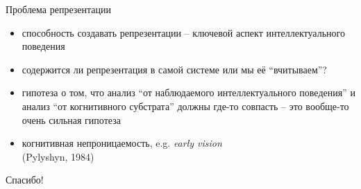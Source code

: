 \documentclass{beamer}
\begin{document}
\begin{frame}{Проблема репрезентации}
\begin{itemize}
	\item способность создавать репрезентации -- ключевой аспект интеллектуального поведения
	\medskip
	\item содержится ли репрезентация в самой системе или мы её ``вчитываем''?
	\medskip
	\item гипотеза о том, что анализ ``от наблюдаемого интеллектуального поведения'' и анализ ``от когнитивного субстрата'' должны где-то совпасть -- это вообще-то очень сильная гипотеза
	\medskip
	\item когнитивная непроницаемость, e.g. \textit{early vision} \\{\small(Pylyshyn, 1984)}
\end{itemize}
\end{frame}


\begin{frame}{}
    \thispagestyle{empty}
    \begin{center}
        {\large Спасибо!}
    \end{center}
\end{frame}
\end{document}
